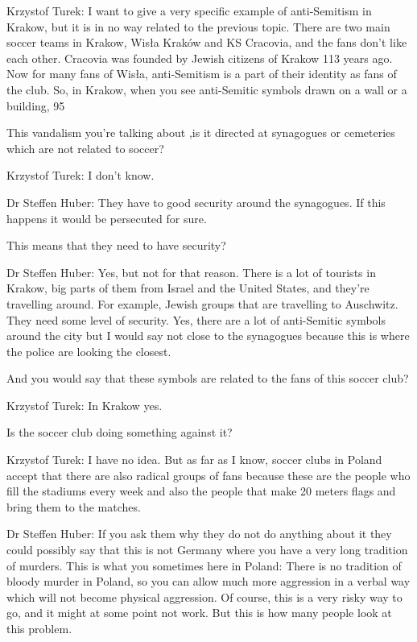  

Krzystof Turek: I want to give a very specific example of anti-Semitism in Krakow, but it is in no way related to the previous topic. There are two main soccer teams in Krakow, Wisła Kraków and KS Cracovia, and the fans don't like each other. Cracovia was founded by Jewish citizens of Krakow 113 years ago. Now for many fans of Wisła, anti-Semitism is a part of their identity as fans of the club. So, in Krakow, when you see anti-Semitic symbols drawn on a wall or a building, 95%

 

 This vandalism you're talking about ,is it directed at synagogues or cemeteries which are not related to soccer? 

 

Krzystof Turek: I don't know. 

Dr Steffen Huber: They have to good security around the synagogues. If this happens it would be persecuted for sure. 

 

 This means that they need to have security?  

 

Dr Steffen Huber: Yes, but not for that reason. There is a lot of tourists in Krakow, big parts of them from Israel and the United States, and they're travelling around. For example, Jewish groups that are travelling to Auschwitz. They need some level of security. Yes, there are a lot of anti-Semitic symbols around the city but I would say not close to the synagogues because this is where the police are looking the closest. 

 

And you would say that these symbols are related to the fans of this soccer club? 

 

Krzystof Turek: In Krakow yes. 

 

Is the soccer club doing something against it? 

 

Krzystof Turek: I have no idea. But as far as I know, soccer clubs in Poland accept that there are also radical groups of fans because these are the people who fill the stadiums every week and also the people that make 20 meters flags and bring them to the matches. 

Dr Steffen Huber: If you ask them why they do not do anything about it they could possibly say that this is not Germany where you have a very long tradition of murders. This is what you sometimes here in Poland: There is no tradition of bloody murder in Poland, so you can allow much more aggression in a verbal way which will not become physical aggression. Of course, this is a very risky way to go, and it might at some point not work. But this is how many people look at this problem. 

